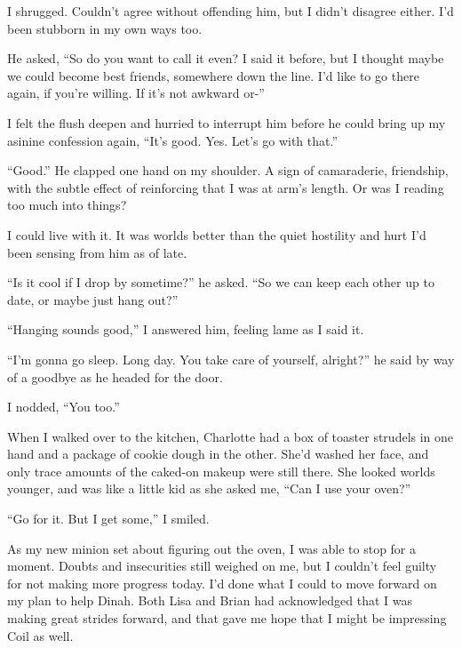 I shrugged.  Couldn't agree without offending him, but I didn't disagree either.   I'd been stubborn in my own ways too.



He asked, ``So do you want to call it even?  I said it before, but I thought maybe we could become best friends, somewhere down the line.  I'd like to go there again, if you're willing.  If it's not awkward or-''



I felt the flush deepen and hurried to interrupt him before he could bring up my asinine confession again, ``It's good.  Yes.  Let's go with that.''



``Good.''  He clapped one hand on my shoulder.  A sign of camaraderie, friendship, with the subtle effect of reinforcing that I was at arm's length.  Or was I reading too much into things?



I could live with it.  It was worlds better than the quiet hostility and hurt I'd been sensing from him as of late.



``Is it cool if I drop by sometime?'' he asked.  ``So we can keep each other up to date, or maybe just hang out?''



``Hanging sounds good,'' I answered him, feeling lame as I said it.



``I'm gonna go sleep.  Long day.  You take care of yourself, alright?'' he said by way of a goodbye as he headed for the door.



I nodded, ``You too.''



When I walked over to the kitchen, Charlotte had a box of toaster strudels in one hand and a package of cookie dough in the other.  She'd washed her face, and only trace amounts of the caked-on makeup were still there.  She looked worlds younger, and was like a little kid as she asked me, ``Can I use your oven?''



``Go for it.  But I get some,'' I smiled.



As my new minion set about figuring out the oven, I was able to stop for a moment.  Doubts and insecurities still weighed on me, but I couldn't feel guilty for not making more progress today.  I'd done what I could to move forward on my plan to help Dinah.  Both Lisa and Brian had acknowledged that I was making great strides forward, and that gave me hope that I might be impressing Coil as well.



